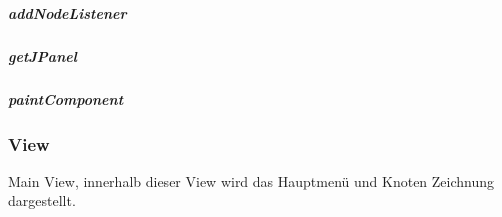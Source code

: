 \documentclass[letterpaper,10pt,ngerman]{sphinxmanual}
\begin{document}
\subparagraph{addNodeListener}
\label{\detokenize{com/linuxluigi/edu/view/NodePanel:addnodelistener}}

\begin{fulllineitems}
\label{\detokenize{com/linuxluigi/edu/view/NodePanel:com.linuxluigi.edu.view.NodePanel.addNodeListener(ActionListener)}}
\end{fulllineitems}



\subparagraph{getJPanel}
\label{\detokenize{com/linuxluigi/edu/view/NodePanel:getjpanel}}

\begin{fulllineitems}
\label{\detokenize{com/linuxluigi/edu/view/NodePanel:com.linuxluigi.edu.view.NodePanel.getJPanel(Listlabel)}}
\end{fulllineitems}



\subparagraph{paintComponent}
\label{\detokenize{com/linuxluigi/edu/view/NodePanel:paintcomponent}}

\begin{fulllineitems}
\label{\detokenize{com/linuxluigi/edu/view/NodePanel:com.linuxluigi.edu.view.NodePanel.paintComponent(Graphics)}}
\end{fulllineitems}



\subsubsection{View}
\label{\detokenize{com/linuxluigi/edu/view/View::doc}}\label{\detokenize{com/linuxluigi/edu/view/View:view}}

\begin{fulllineitems}
\label{\detokenize{com/linuxluigi/edu/view/View:com.linuxluigi.edu.view.View}}
Main View, innerhalb dieser View wird das Hauptmenü und Knoten Zeichnung dargestellt.

\end{fulllineitems}
\end{document}
